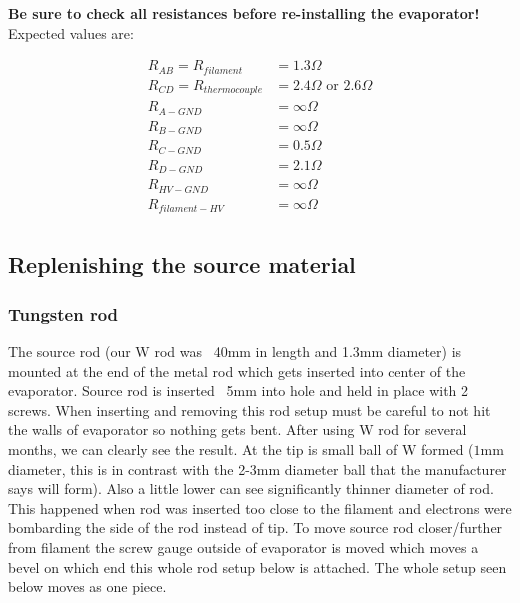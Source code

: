 \textbf{Be sure to check all resistances before re-installing the evaporator!} Expected values are:

\begin{align*}   %
R_{AB} = R_{filament} &= 1.3 \Omega \\ 
R_{CD} = R_{thermocouple} &= 2.4 \Omega \text { or } 2.6 \Omega\\
R_{A-GND} &= \infty \Omega \\
R_{B-GND} &= \infty \Omega \\
R_{C-GND} &= 0.5 \Omega \\
R_{D-GND} &= 2.1 \Omega \\
R_{HV-GND} &= \infty \Omega \\
R_{filament-HV} &= \infty \Omega \\
\end{align*}



\subsection{Replenishing the source material}
\subsubsection*{Tungsten rod}
The source rod (our W rod was ~40mm in length and 1.3mm diameter) is mounted at the end of the metal rod which gets inserted into center of the evaporator. Source rod is inserted ~5mm into hole and held in place with 2 screws. When inserting and removing this rod setup must be careful to not hit the walls of evaporator so nothing gets bent. After using W rod for several months, we can clearly see the result. At the tip is small ball of W formed ($1$mm diameter, this is in contrast with the 2-3mm diameter ball that the manufacturer says will form). Also a little lower can see significantly thinner diameter of rod. This happened when rod was inserted too close to the filament and electrons were bombarding the side of the rod instead of tip.  To move source rod closer/further from filament the screw gauge outside of evaporator is moved which moves a bevel on which end this whole rod setup below is attached. The whole setup seen below moves as one piece.

